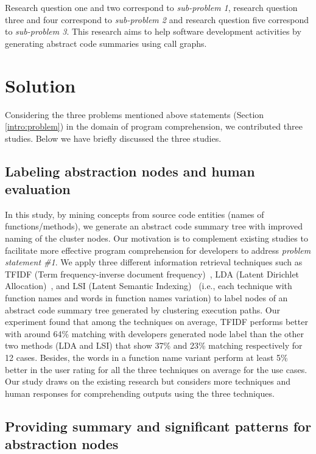 Research question one and two correspond to \emph{sub-problem 1}, research question three and four correspond to \emph{sub-problem 2} and research question five correspond to \emph{sub-problem 3}. This research aims to help software development activities by generating abstract code summaries using call graphs. 



\section{Solution}
\label{intro:solution}
Considering the three problems mentioned above statements (Section \ref{intro:problem}) in the domain of program comprehension, we contributed three studies. Below we have briefly discussed the three studies.  

\subsection{Labeling abstraction nodes and human evaluation}

In this study, by mining concepts from source code entities (names of functions/methods), we generate an abstract code summary tree
with improved naming of the cluster nodes. Our motivation is to complement existing studies to facilitate more effective program comprehension for
developers to address \emph{problem statement \#1}. We apply three different information retrieval techniques such as TFIDF (Term frequency-inverse document frequency)~\cite{ramos2003usingTfidfRelevance}, LDA (Latent  Dirichlet  Allocation)~\cite{blei2003latentLDA}, and LSI (Latent Semantic Indexing)~\cite{deerwester1990indexingLSI} (i.e., each technique with function
names and words in function names variation) to label nodes of an abstract code summary tree generated by clustering execution paths. Our experiment found that among the techniques on average, TFIDF performs better with around 64\% matching with developers generated node label than the other
two methods (LDA and LSI) that show 37\% and 23\% matching respectively for 12 cases. Besides,
the words in a function name variant perform at least 5\% better in the user rating for all the three techniques on average for the use cases.
Our study draws on the existing research but considers more techniques and human responses for comprehending outputs using the three
techniques.

\subsection{Providing summary and significant patterns for abstraction nodes}

